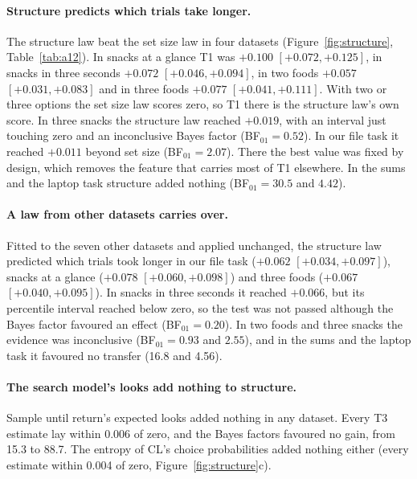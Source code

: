\documentclass[11pt]{article}
\begin{document}
\paragraph{Structure predicts which trials take longer.} The structure law beat the set size law in four datasets (Figure~\ref{fig:structure}, Table~\ref{tab:a12}). In snacks at a glance T1 was $+0.100$ $[+0.072, +0.125]$, in snacks in three seconds $+0.072$ $[+0.046, +0.094]$, in two foods $+0.057$ $[+0.031, +0.083]$ and in three foods $+0.077$ $[+0.041, +0.111]$. With two or three options the set size law scores zero, so T1 there is the structure law's own score. In three snacks the structure law reached $+0.019$, with an interval just touching zero and an inconclusive Bayes factor (BF$_{01} = 0.52$). In our file task it reached $+0.011$ beyond set size (BF$_{01} = 2.07$). There the best value was fixed by design, which removes the feature that carries most of T1 elsewhere. In the sums and the laptop task structure added nothing (BF$_{01} = 30.5$ and $4.42$).

\paragraph{A law from other datasets carries over.} Fitted to the seven other datasets and applied unchanged, the structure law predicted which trials took longer in our file task ($+0.062$ $[+0.034, +0.097]$), snacks at a glance ($+0.078$ $[+0.060, +0.098]$) and three foods ($+0.067$ $[+0.040, +0.095]$). In snacks in three seconds it reached $+0.066$, but its percentile interval reached below zero, so the test was not passed although the Bayes factor favoured an effect (BF$_{01} = 0.20$). In two foods and three snacks the evidence was inconclusive (BF$_{01} = 0.93$ and $2.55$), and in the sums and the laptop task it favoured no transfer (16.8 and 4.56).

\paragraph{The search model's looks add nothing to structure.} Sample until return's expected looks added nothing in any dataset. Every T3 estimate lay within 0.006 of zero, and the Bayes factors favoured no gain, from 15.3 to 88.7. The entropy of CL's choice probabilities added nothing either (every estimate within 0.004 of zero, Figure~\ref{fig:structure}c).


\end{document}
